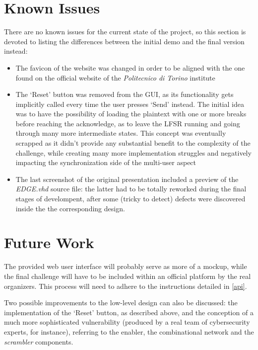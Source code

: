 \section{Known Issues}
There are no known issues for the current state of the project, so this section is devoted to listing the differences between the initial demo and the final version instead:
\begin{itemize}
    \item The favicon of the website was changed in order to be aligned with the one found on the official website of the \emph{Politecnico di Torino} institute
    \item The `Reset' button was removed from the GUI, as its functionality gets implicitly called every time the user presses `Send' instead.
    The initial idea was to have the possibility of loading the plaintext with one or more breaks before reaching the acknowledge, as to leave the LFSR running and going through many more intermediate states.
    This concept was eventually scrapped as it didn't provide any substantial benefit to the complexity of the challenge, while creating many more implementation struggles and negatively impacting the synchronization side of the multi-user aspect
    \item The last screenshot of the original presentation included a preview of the \emph{EDGE.vhd} source file: the latter had to be totally reworked during the final stages of develompent, after some (tricky to detect) defects were discovered inside the the corresponding design.
\end{itemize}
\section{Future Work}
The provided web user interface will probably serve as more of a mockup, while the final challenge will have to be included within an official platform by the real organizers. This process will need to adhere to the instructions detailed in \autoref{api}.

Two possible improvements to the low-level design can also be discussed: the implementation of the `Reset' button, as described above, and the conception of a much more sophisticated vulnerability (produced by a real team of cybersecurity experts, for instance), referring to the enabler, the combinational network and the \emph{scrambler} components.